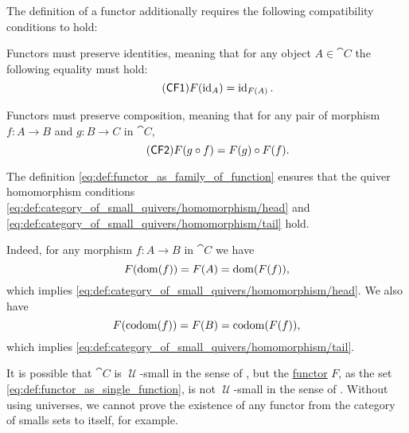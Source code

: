 \begin{definition}
  The definition of a functor additionally requires the following compatibility conditions to hold:
  \begin{thmenum}[series=def:functor]
     Functors must preserve identities, meaning that for any object \( A \in \cat{C} \) the following equality must hold:
    \begin{equation}\label{eq:def:functor/CF1}\tag{\logic{CF1}}
      F(\id_A) = \id_{F(A)}.
    \end{equation}

     Functors must preserve composition, meaning that for any pair of morphism \( f: A \to B \) and \( g: B \to C \) in \( \cat{C} \),
    \begin{equation}\label{eq:def:functor/CF2}\tag{\logic{CF2}}
      F(g \bincirc f) = F(g) \bincirc F(f).
    \end{equation}
  \end{thmenum}
\end{definition}
\begin{defproof}
  The definition \eqref{eq:def:functor_as_family_of_function} ensures that the quiver homomorphism conditions \eqref{eq:def:category_of_small_quivers/homomorphism/head} and \eqref{eq:def:category_of_small_quivers/homomorphism/tail} hold.

  Indeed, for any morphism \( f: A \to B \) in \( \cat{C} \) we have
  \begin{equation*}
    F(\operatorname{dom}(f)) = F(A) = \operatorname{dom}(F(f)),
  \end{equation*}
  which implies \eqref{eq:def:category_of_small_quivers/homomorphism/head}. We also have
  \begin{equation*}
    F(\operatorname*{co\negthinspace\operatorname{dom}}(f)) = F(B) = \operatorname*{co\negthinspace\operatorname{dom}}(F(f)),
  \end{equation*}
  which implies \eqref{eq:def:category_of_small_quivers/homomorphism/tail}.
\end{defproof}

\begin{remark}\label{rem:functor_size}
  It is possible that \( \cat{C} \) is \( \mscrU \)-small in the sense of , but the \hyperref[def:functor]{functor} \( F \), as the set \eqref{eq:def:functor_as_single_function}, is not \( \mscrU \)-small in the sense of . Without using universes, we cannot prove the existence of any functor from the category of smalls sets to itself, for example.
\end{remark}

